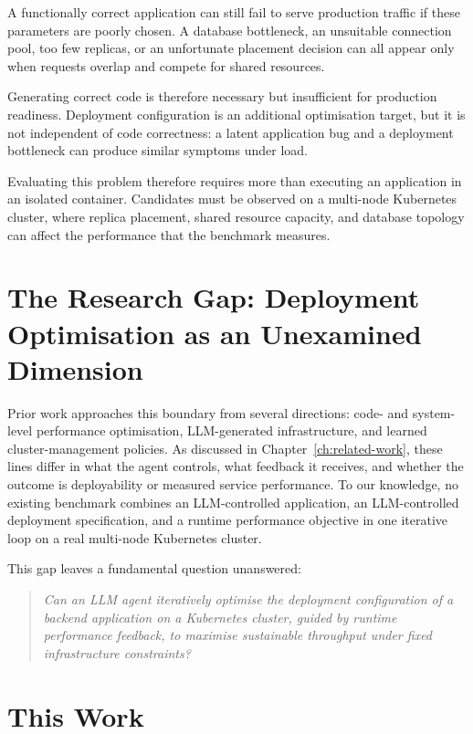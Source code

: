 A functionally correct application can still fail to serve production traffic
if these parameters are poorly chosen. A database bottleneck, an unsuitable
connection pool, too few replicas, or an unfortunate placement decision can
all appear only when requests overlap and compete for shared resources.

Generating correct code is therefore necessary but insufficient for production
readiness. Deployment configuration is an additional optimisation target, but
it is not independent of code correctness: a latent application bug and a
deployment bottleneck can produce similar symptoms under load.

Evaluating this problem therefore requires more than executing an application
in an isolated container. Candidates must be observed on a multi-node
Kubernetes cluster, where replica placement, shared resource capacity, and
database topology can affect the performance that the benchmark measures.


\section{The Research Gap: Deployment Optimisation as an Unexamined Dimension}
\label{sec:intro-missing}

Prior work approaches this boundary from several directions: code- and
system-level performance optimisation, LLM-generated infrastructure, and
learned cluster-management policies. As discussed in
Chapter~\ref{ch:related-work}, these lines differ in what the agent controls,
what feedback it receives, and whether the outcome is deployability or measured
service performance. To our knowledge, no existing benchmark combines an
LLM-controlled application, an LLM-controlled deployment specification, and a
runtime performance objective in one iterative loop on a real multi-node
Kubernetes cluster.

This gap leaves a fundamental question unanswered:
%
\begin{quote}
  \emph{Can an LLM agent iteratively optimise the deployment configuration of
  a backend application on a Kubernetes cluster, guided by runtime performance
  feedback, to maximise sustainable throughput under fixed infrastructure
  constraints?}
\end{quote}


\section{This Work}
\label{sec:intro-thiswork}

